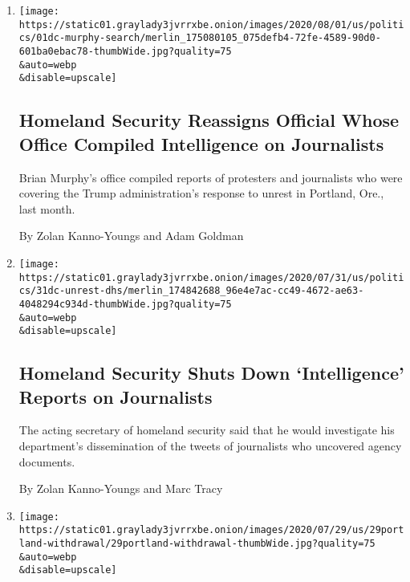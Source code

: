 \begin{enumerate}
\def\labelenumi{\arabic{enumi}.}
\item
  \href{/2020/08/01/us/politics/brian-murphy-homeland-security-protesters.html}{}

  \texttt{[image: https://static01.graylady3jvrrxbe.onion/images/2020/08/01/us/politics/01dc-murphy-search/merlin\_175080105\_075defb4-72fe-4589-90d0-601ba0ebac78-thumbWide.jpg?quality=75\\\&auto=webp\\\&disable=upscale]}

  \hypertarget{homeland-security-reassigns-official-whose-office-compiled-intelligence-on-journalists}{%
  \subsection{Homeland Security Reassigns Official Whose Office Compiled
  Intelligence on
  Journalists}\label{homeland-security-reassigns-official-whose-office-compiled-intelligence-on-journalists}}

  Brian Murphy's office compiled reports of protesters and journalists
  who were covering the Trump administration's response to unrest in
  Portland, Ore., last month.

  By Zolan Kanno-Youngs and Adam Goldman
\item
  \href{/2020/07/31/us/politics/homeland-security-portland.html}{}

  \texttt{[image: https://static01.graylady3jvrrxbe.onion/images/2020/07/31/us/politics/31dc-unrest-dhs/merlin\_174842688\_96e4e7ac-cc49-4672-ae63-4048294c934d-thumbWide.jpg?quality=75\\\&auto=webp\\\&disable=upscale]}

  \hypertarget{homeland-security-shuts-down-intelligence-reports-on-journalists}{%
  \subsection{Homeland Security Shuts Down `Intelligence' Reports on
  Journalists}\label{homeland-security-shuts-down-intelligence-reports-on-journalists}}

  The acting secretary of homeland security said that he would
  investigate his department's dissemination of the tweets of
  journalists who uncovered agency documents.

  By Zolan Kanno-Youngs and Marc Tracy
\item
  \href{/2020/07/29/us/protests-portland-federal-withdrawal.html}{}

  \texttt{[image: https://static01.graylady3jvrrxbe.onion/images/2020/07/29/us/29portland-withdrawal/29portland-withdrawal-thumbWide.jpg?quality=75\\\&auto=webp\\\&disable=upscale]}


\end{enumerate}

